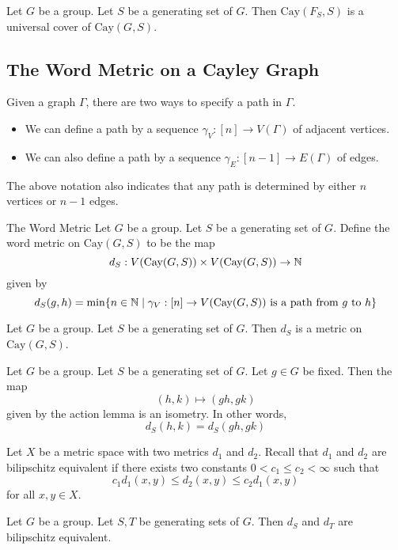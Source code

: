 \documentclass[a4paper]{article}
\begin{document}
\begin{prp}{}{} Let $G$ be a group. Let $S$ be a generating set of $G$. Then $\text{Cay}(F_S,S)$ is a universal cover of $\text{Cay}(G,S)$. 
\end{prp}

\subsection{The Word Metric on a Cayley Graph}
Given a graph $\Gamma$, there are two ways to specify a path in $\Gamma$. 
\begin{itemize}
\item We can define a path by a sequence $\gamma_V:[n]\to V(\Gamma)$ of adjacent vertices. 
\item We can also define a path by a sequence $\gamma_E:[n-1]\to E(\Gamma)$ of edges. 
\end{itemize}

The above notation also indicates that any path is determined by either $n$ vertices or $n-1$ edges. 

\begin{defn}{The Word Metric}{} Let $G$ be a group. Let $S$ be a generating set of $G$. Define the word metric on $\text{Cay}(G,S)$ to be the map $$d_S:V(\text{Cay}(G,S))\times V(\text{Cay}(G,S))\to\mathbb{N}$$ given by $$d_S(g,h)=\min\{n\in\mathbb{N}\;|\;\gamma_V:[n]\to V(\text{Cay}(G,S))\text{ is a path from }g\text{ to }h\}$$
\end{defn}

\begin{lmm}{}{} Let $G$ be a group. Let $S$ be a generating set of $G$. Then $d_S$ is a metric on $\text{Cay}(G,S)$. 
\end{lmm}

\begin{prp}{}{} Let $G$ be a group. Let $S$ be a generating set of $G$. Let $g\in G$ be fixed. Then the map $$(h,k)\mapsto(gh,gk)$$ given by the action lemma is an isometry. In other words, $$d_S(h,k)=d_S(gh,gk)$$
\end{prp}

Let $X$ be a metric space with two metrics $d_1$ and $d_2$. Recall that $d_1$ and $d_2$ are bilipschitz equivalent if there exists two constants $0<c_1\leq c_2<\infty$ such that $$c_1d_1(x,y)\leq d_2(x,y)\leq c_2d_1(x,y)$$ for all $x,y\in X$. 

\begin{lmm}{}{} Let $G$ be a group. Let $S,T$ be generating sets of $G$. Then $d_S$ and $d_T$ are bilipschitz equivalent. 
\end{lmm}
\end{document}
